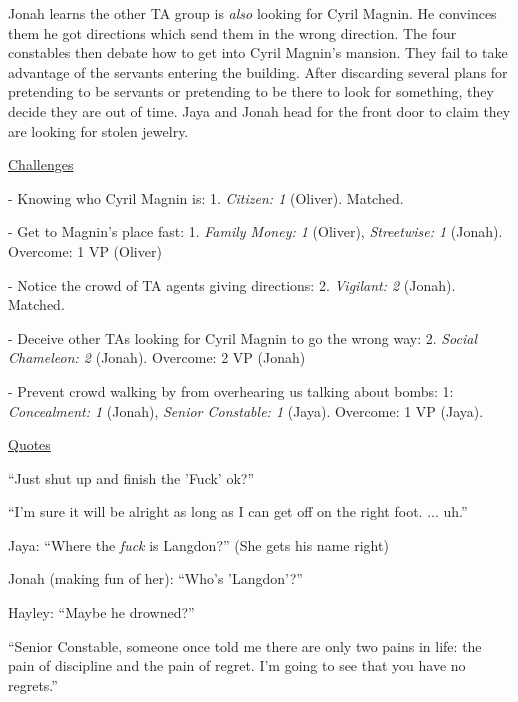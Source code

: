 Jonah learns the other TA group is \textit{also} looking for Cyril Magnin.  He convinces them he got directions which send them in the wrong direction.  The four constables then debate how to get into Cyril Magnin's mansion.  They fail to take advantage of the servants entering the building.  After discarding several plans for pretending to be servants or pretending to be there to look for something, they decide they are out of time.  Jaya and Jonah head for the front door to claim they are looking for stolen jewelry.



\underline{  {\LARGE Challenges }  }



- Knowing who Cyril Magnin is: 1.  \textit{Citizen: 1} (Oliver).  Matched.

- Get to Magnin's place fast: 1.  \textit{Family Money: 1} (Oliver), \textit{Streetwise: 1} (Jonah). Overcome: 1 VP (Oliver)

- Notice the crowd of TA agents giving directions: 2.  \textit{Vigilant: 2} (Jonah).  Matched.

- Deceive other TAs looking for Cyril Magnin to go the wrong way: 2.  \textit{Social Chameleon: 2} (Jonah). Overcome: 2 VP (Jonah)

- Prevent crowd walking by from overhearing us talking about bombs: 1: \textit{Concealment: 1} (Jonah), \textit{Senior Constable: 1} (Jaya).  Overcome: 1 VP (Jaya).



\underline{  {\LARGE Quotes }  }



``Just shut up and finish the 'Fuck' ok?''




``I'm sure it will be alright as long as I can get off on the right foot. ... uh.'' 




Jaya: ``Where the \textit{fuck} is Langdon?'' (She gets his name right)

\parskip=0pt
Jonah (making fun of her): ``Who's 'Langdon'?''

\parskip=0pt
Hayley: ``Maybe he drowned?''



``Senior Constable, someone once told me there are only two pains in life: the pain of discipline and the pain of regret.  I'm going to see that you have no regrets.''

